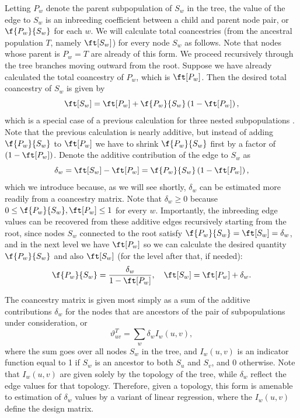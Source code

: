 \documentclass[11pt]{article}
\begin{document}
Letting $P_w$ denote the parent subpopulation of $S_w$ in the tree, the value of the edge to $S_w$ is an inbreeding coefficient between a child and parent node pair, or $\f{P_w}{S_w}$ for each $w$.
We will calculate total coancestries (from the ancestral population $T$, namely $\ft[S_w]$) for every node $S_w$ as follows.
Note that nodes whose parent is $P_w = T$ are already of this form.
We proceed recursively through the tree branches moving outward from the root.
Suppose we have already calculated the total coancestry of $P_w$, which is $\ft[P_w]$.
Then the desired total coancestry of $S_w$ is given by
$$
\ft[S_w] = \ft[P_w] + \f{P_w}{S_w} \left( 1 - \ft[P_w] \right),
$$
which is a special case of a previous calculation for three nested subpopulations \citep{ochoa_fst1}.
Note that the previous calculation is nearly additive, but instead of adding $\f{P_w}{S_w}$ to $\ft[P_w]$ we have to shrink $\f{P_w}{S_w}$ first by a factor of $\left( 1 - \ft[P_w] \right)$.
Denote the additive contribution of the edge to $S_w$ as
$$
\delta_w = \ft[S_w] - \ft[P_w] = \f{P_w}{S_w} \left( 1 - \ft[P_w] \right),
$$
which we introduce because, as we will see shortly, $\delta_w$ can be estimated more readily from a coancestry matrix.
Note that $\delta_w \ge 0$ because $0 \le \f{P_w}{S_w}, \ft[P_w] \le 1$ for every $w$.
Importantly, the inbreeding edge values can be recovered from these additive edges recursively starting from the root, since nodes $S_w$ connected to the root satisfy
$\f{P_w}{S_w} = \ft[S_w] = \delta_w$,
and in the next level we have $\ft[P_w]$ so we can calculate the desired quantity $\f{P_w}{S_w}$ and also $\ft[S_w]$ (for the level after that, if needed):
\begin{equation*}
  \f{P_w}{S_w}
  =
  \frac{ \delta_w }{ 1 - \ft[P_w] },
  \quad
  \ft[S_w]
  =
  \ft[P_w] + \delta_w
  .
\end{equation*}

The coancestry matrix is given most simply as a sum of the additive contributions $\delta_w$ for the nodes that are ancestors of the pair of subpopulations under consideration, or
\begin{equation}
  \label{eq:coanc_tree_additive}
  \vartheta_{uv}^T
  =
  \sum_w \delta_w I_w(u,v)
  ,
\end{equation}
where the sum goes over all nodes $S_w$ in the tree, and $I_w(u,v)$ is an indicator function equal to 1 if $S_w$ is an ancestor to both $S_u$ and $S_v$, and 0 otherwise.
Note that $I_w(u,v)$ are given solely by the topology of the tree, while $\delta_w$ reflect the edge values for that topology.
Therefore, given a topology, this form is amenable to estimation of $\delta_w$ values by a variant of linear regression, where the $I_w(u,v)$ define the design matrix.
\end{document}

